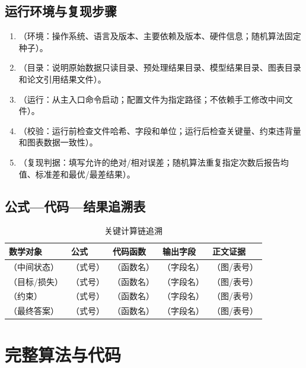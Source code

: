 \documentclass[UTF8,zihao=-4]{ctexart}
\newcommand{\fillin}[1]{（#1）}
\begin{document}
\subsection{运行环境与复现步骤}

\begin{enumerate}[leftmargin=2em,itemsep=0pt,topsep=2pt]
  \item \fillin{环境：操作系统、语言及版本、主要依赖及版本、硬件信息；随机算法固定种子}。
  \item \fillin{目录：说明原始数据只读目录、预处理结果目录、模型结果目录、图表目录和论文引用结果文件}。
  \item \fillin{运行：从主入口命令启动；配置文件为指定路径；不依赖手工修改中间文件}。
  \item \fillin{校验：运行前检查文件哈希、字段和单位；运行后检查关键量、约束违背量和图表数据一致性}。
  \item \fillin{复现判据：填写允许的绝对/相对误差；随机算法重复指定次数后报告均值、标准差和最优/最差结果}。
\end{enumerate}

\subsection{公式—代码—结果追溯表}

\begin{table}[htbp]
  \centering
  \caption{关键计算链追溯}
  \small
  \begin{tabularx}{0.90\textwidth}{YYYYY}
    \toprule
    数学对象 & 公式 & 代码函数 & 输出字段 & 正文证据 \\
    \midrule
    \fillin{中间状态} & \fillin{式号} & \fillin{函数名} & \fillin{字段名} & \fillin{图/表号} \\
    \fillin{目标/损失} & \fillin{式号} & \fillin{函数名} & \fillin{字段名} & \fillin{图/表号} \\
    \fillin{约束} & \fillin{式号} & \fillin{函数名} & \fillin{字段名} & \fillin{图/表号} \\
    \fillin{最终答案} & \fillin{式号} & \fillin{函数名} & \fillin{字段名} & \fillin{图/表号} \\
    \bottomrule
  \end{tabularx}
\end{table}

\clearpage
\section{完整算法与代码}
\end{document}
